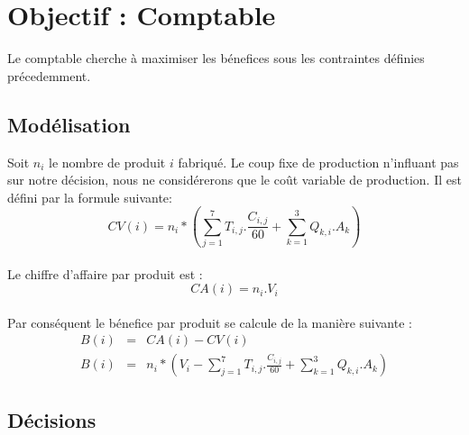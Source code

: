 \newpage
\section{Objectif : Comptable}
Le comptable cherche à maximiser les bénefices sous les contraintes définies
précedemment.

\subsection{Modélisation}
Soit $n_i$ le nombre de produit $i$ fabriqué. Le coup fixe de production
n'influant pas sur notre décision, nous ne considérerons que le coût variable de
production. Il est défini par la formule suivante:
\begin{displaymath}
CV(i) = n_i * \left (\sum_{j = 1}^{7} T_{i,j} .
\frac{C_{i,j}}{60} + \sum_{k = 1}^{3} Q_{k,i} . A_{k} \right )
\end{displaymath}
~\\
Le chiffre d'affaire par produit est :
\begin{displaymath}
CA(i) = n_i . V_i
\end{displaymath}
~\\
Par conséquent le bénefice par produit se calcule de la manière suivante :
\begin{eqnarray*}
	B(i) &=& CA(i) - CV(i)\\
	B(i) &=& n_i * \left (V_i - \sum_{j = 1}^{7} T_{i,j} . \frac{C_{i,j}}{60} +
	\sum_{k = 1}^{3} Q_{k,i} . A_{k} \right )
\end{eqnarray*}

\subsection{Décisions}